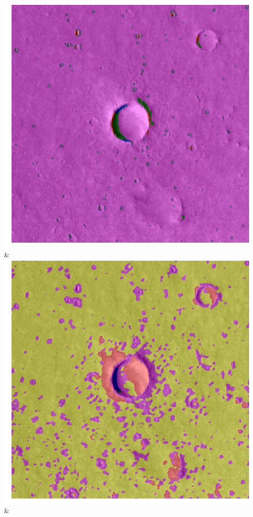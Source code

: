 \begin{table}[h!]
\begin{tabularx}{\textwidth}
		\includegraphics[width=0.9\linewidth]{images/gen/convolution_number/p03_01.png_3.png} &
		\includegraphics[width=0.9\linewidth]{images/gen/convolution_number/p03_01.png_4.png} &

\end{tabularx}
\end{table}
